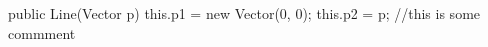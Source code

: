 



\begin{code}
public Line(Vector p) {
    this.p1 = new Vector(0, 0);
    this.p2 = p;
    //this is some commment
}
\end{code}

